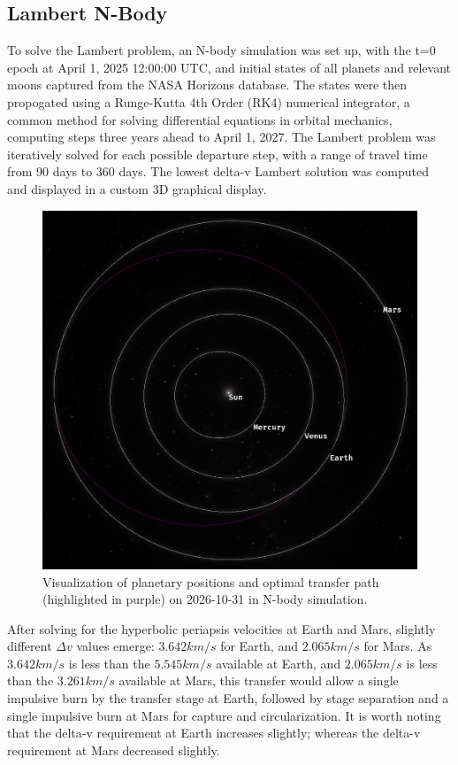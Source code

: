 \documentclass[conference]{IEEEtran}
\begin{document}
	\subsection{Lambert N-Body}
	To solve the Lambert problem, an N-body simulation was set up, with the t=0 epoch at April 1, 2025 12:00:00 UTC, and initial states of all planets and relevant moons captured from the NASA Horizons database. The states were then propogated using a Runge-Kutta 4th Order (RK4) numerical integrator, a common method for solving differential equations in orbital mechanics, computing steps three years ahead to April 1, 2027. The Lambert problem was iteratively solved for each possible departure step, with a range of travel time from 90 days to 360 days. The lowest delta-v Lambert solution was computed and displayed in a custom 3D graphical display.
	
	\begin{figure}[H]
		\centerline{\includegraphics[width=\linewidth]{fig2.png}}
		\caption{Visualization of planetary positions and optimal transfer path (highlighted in purple) on 2026-10-31 in N-body simulation.}
		\label{fig2}
	\end{figure}
	
	After solving for the hyperbolic periapsis velocities at Earth and Mars, slightly different $\Delta v$ values emerge: $3.642km/s$ for Earth, and $2.065km/s$ for Mars. As $3.642km/s$ is less than the $5.545km/s$ available at Earth, and $2.065km/s$ is less than the $3.261km/s$ available at Mars, this transfer would allow a single impulsive burn by the transfer stage at Earth, followed by stage separation and a single impulsive burn at Mars for capture and circularization. It is worth noting that the delta-v requirement at Earth increases slightly; whereas the delta-v requirement at Mars decreased slightly. 
	
\end{document}
